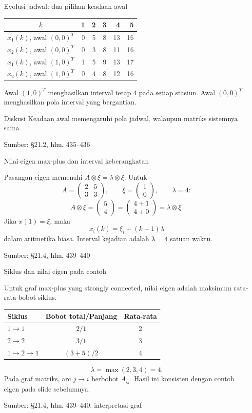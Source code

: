 \documentclass[aspectratio=169,11pt]{beamer}
\newcommand{\source}[1]{%
    \vfill
    \hfill{\tiny\color{gray}Sumber: #1}
}
\newcommand{\mpmat}[1]{\begin{pmatrix}#1\end{pmatrix}}
\begin{document}
\begin{frame}{Evolusi jadwal: dua pilihan keadaan awal}


\begin{center}\begin{tabular}{c|rrrrr}\toprule
$k$&1&2&3&4&5\\\midrule
$x_1(k)$, awal $(0,0)^T$&0&5&8&13&16\\
$x_2(k)$, awal $(0,0)^T$&0&3&8&11&16\\\midrule
$x_1(k)$, awal $(1,0)^T$&1&5&9&13&17\\
$x_2(k)$, awal $(1,0)^T$&0&4&8&12&16\\\bottomrule
\end{tabular}\end{center}
Awal $(1,0)^T$ menghasilkan interval tetap $4$ pada setiap stasiun.
Awal $(0,0)^T$ menghasilkan pola interval yang bergantian.
\begin{exampleblock}{Diskusi}
Keadaan awal memengaruhi pola jadwal, walaupun matriks sistemnya sama.
\end{exampleblock}

\source{\S21.2, hlm. 435--436}

\end{frame}
\begin{frame}{Nilai eigen max-plus dan interval keberangkatan}


Pasangan eigen memenuhi $A\otimes\xi=\lambda\otimes\xi$.
Untuk
\[
A=\mpmat{2&5\\3&3},\qquad \xi=\mpmat{1\\0},\qquad\lambda=4:
\]
\[
A\otimes\xi=\mpmat{5\\4}
=\mpmat{4+1\\4+0}=\lambda\otimes\xi.
\]
Jika $x(1)=\xi$, maka
\[
x_i(k)=\xi_i+(k-1)\lambda
\]
dalam aritmetika biasa. Interval kejadian adalah $\lambda=4$ satuan waktu.

\source{\S21.4, hlm. 439--440}

\end{frame}
\begin{frame}{Siklus dan nilai eigen pada contoh}


Untuk graf max-plus yang strongly connected, nilai eigen adalah
maksimum rata-rata bobot siklus.
\begin{center}\begin{tabular}{lcc}\toprule
Siklus&Bobot total/Panjang&Rata-rata\\\midrule
$1\to1$&$2/1$&2\\
$2\to2$&$3/1$&3\\
$1\to2\to1$&$(3+5)/2$&4\\\bottomrule
\end{tabular}\end{center}
\[
\lambda=\max(2,3,4)=4.
\]
Pada graf matriks, arc $j\to i$ berbobot $A_{ij}$.
Hasil ini konsisten dengan contoh eigen pada slide sebelumnya.

\source{\S21.4, hlm. 439--440; interpretasi graf}

\end{frame}
\end{document}
